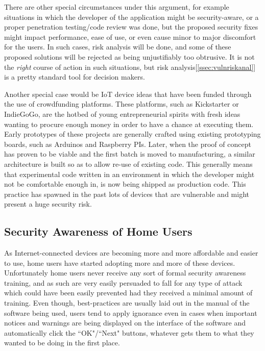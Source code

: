 \documentclass[a4paper,12pt]{article}
\begin{document}
	There are other special circumstances under this argument, for example situations in which the developer of the application might be security-aware, or a proper penetration testing/code review was done, but the proposed security fixes might impact performance, ease of use, or even cause minor to major discomfort for the users. In such cases, risk analysis will be done, and some of these proposed solutions will be rejected as being unjustifiably too obtrusive. It is not the \textit{right} course of action in such situations, but risk analysis[\ref{ssec:vulnriskanal}] is a pretty standard tool for decision makers.
	
	Another special case would be IoT device ideas that have been funded through the use of crowdfunding platforms. These platforms, such as Kickstarter or IndieGoGo, are the hotbed of young entrepreneurial spirits with fresh ideas wanting to procure enough money in order to have a chance at executing them. Early prototypes of these projects are generally crafted using existing prototyping boards, such as Arduinos and Raspberry PIs. Later, when the proof of concept has proven to be viable and the first batch is moved to manufacturing, a similar architecture is built so as to allow re-use of existing code. This generally means that experimental code written in an environment in which the developer might not be comfortable enough in, is now being shipped as production code. This practice has spawned in the past lots of devices that are vulnerable and might present a huge security risk.\cite{mstan14}
	
\subsection{Security Awareness of Home Users}
	
	As Internet-connected devices are becoming more and more affordable and easier to use, home users have started adopting more and more of these devices. Unfortunately home users never receive any sort of formal security awareness training, and as such are very easily persuaded to fall for any type of attack which could have been easily prevented had they received a minimal amount of training. Even though, best-practices are usually laid out in the manual of the software being used, users tend to apply ignorance\cite{jnielsen12} even in cases when important notices and warnings are being displayed on the interface of the software and automatically click the ``OK"/``Next" buttons, whatever gets them to what they wanted to be doing in the first place.
	
\end{document}
